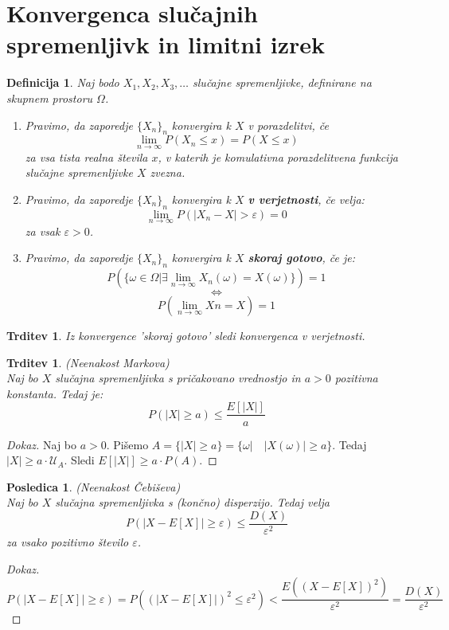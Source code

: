 \documentclass[11pt]{article}
\newtheorem{Trditev}[Izrek]{{\sc Trditev}}
\newtheorem{Posledica}[Izrek]{{\sc Posledica}}
\newtheorem{Definicija}[Izrek]{{\sc Definicija}}
\newenvironment{dokaz}[1][{\sc Dokaz}]{\begin{proof}[#1]\renewcommand*{\qedsymbol}{\(\blacksquare\)}}{\end{proof}}
\begin{document}
	\section{Konvergenca slučajnih spremenljivk in limitni izrek}
	\begin{Definicija}
		Naj bodo $X_1,X_2,X_3,\ldots $ slučajne spremenljivke, definirane na skupnem prostoru $\Omega$.
		\begin{enumerate}
			\item
			Pravimo, da zaporedje $\{X_n\}_n$ konvergira k $X$ v porazdelitvi, če $$\lim\limits_{n \to \infty}{P(X_n \le x)} = P(X\le x)$$
			za vsa tista realna števila $x$, v katerih je komulativna porazdelitvena funkcija slučajne spremenljivke $X$ zvezna.
			\item
			Pravimo, da zaporedje $\{X_n\}_n$ konvergira k $X$ \textbf{v verjetnosti}, če velja:
			$$\lim\limits_{n \to \infty}{P(|X_n - X|>\varepsilon)} = 0$$
			za vsak $\varepsilon > 0$.
			\item
			Pravimo, da zaporedje $\{X_n\}_n$ konvergira k $X$ \textbf{skoraj gotovo}, če je:
			$$P(\{\omega \in \Omega | \exists \lim\limits_{n \to \infty}{X_n(\omega) = X(\omega)}\}) = 1$$	
			$$\iff$$
			$$P(\lim_{n\to \infty}{Xn=X} )= 1$$
		\end{enumerate}
	\end{Definicija}
	\begin{Trditev}
		Iz konvergence 'skoraj gotovo' sledi konvergenca v verjetnosti.
	\end{Trditev}
	\begin{Trditev}
		(Neenakost Markova)
		\\
		Naj bo $X$ slučajna spremenljivka s pričakovano vrednostjo in $a>0$ pozitivna konstanta. Tedaj je:
		$$P(|X| \ge a) \le \frac{E[|X|]}{a}$$
	\end{Trditev}
	\begin{dokaz}
		Naj bo $a>0$. Pišemo $A =  \{|X| \ge a\} = \{\omega |\quad |X(\omega)| \ge a  \}$. Tedaj $|X| \ge a \cdot \mathcal{U}_A$. Sledi $E[|X|] \ge a \cdot P(A)$.
	\end{dokaz}
	\begin{Posledica}
		(Neenakost Čebiševa)
		\\
		Naj bo $X$ slučajna spremenljivka s (končno) disperzijo. Tedaj velja
		$$P(|X - E[X]|\ge \varepsilon) \le \frac{D(X)}{\varepsilon ^2}$$
		za vsako pozitivno število $\varepsilon$.
	\end{Posledica}
	\begin{dokaz}
		$$P(|X- E[X]| \ge \varepsilon) = P( (|X - E[X]|)^2 \le \varepsilon ^2) < \frac{E((X - E[X])^2)}{\varepsilon ^2} = \frac{D(X)}{\varepsilon ^2}$$
	\end{dokaz}
\end{document}
